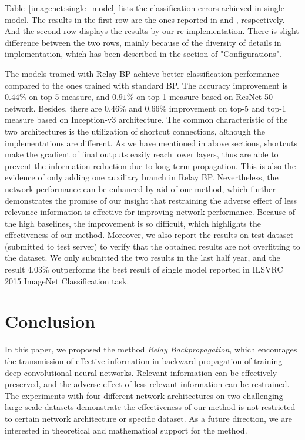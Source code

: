 \documentclass[runningheads]{llncs}
\begin{document}
Table~\ref{imagenet:single_model} lists the classification errors achieved in single model. The results in the first row are the ones reported in \cite{he_cvpr2016} and \cite{szegedy_2015}, respectively. And the second row displays the results by our re-implementation. There is slight difference between the two rows, mainly because of the diversity of details in implementation, which has been described in the section of "Configurations".

The models trained with Relay BP achieve better classification performance compared to the ones trained with standard BP. The accuracy improvement is $0.44\%$ on top-5 measure, and $0.91\%$ on top-1 measure based on ResNet-50 network. Besides, there are $0.46\%$ and $0.66\%$ improvement on top-5 and top-1 measure based on Inception-v3 architecture. The common characteristic of the two architectures is the utilization of shortcut connections, although the implementations are different. As we have mentioned in above sections, shortcuts make the gradient of final outputs easily reach lower layers, thus are able to prevent the information reduction due to long-term propagation. This is also the evidence of only adding one auxiliary branch in Relay BP. Nevertheless, the network performance can be enhanced by aid of our method, which further demonstrates the promise of our insight that restraining the adverse effect of less relevance information is effective for improving network performance. Because of the high baselines, the improvement is so difficult, which highlights the effectiveness of our method. Moreover, we also report the results on test dataset (submitted to test server) to verify that the obtained results are not overfitting to the dataset. We only submitted the two results in the last half year, and the result $4.03\%$ outperforms the best result of single model reported in ILSVRC 2015 ImageNet Classification task.


\section{Conclusion}
In this paper, we proposed the method {\it Relay Backpropagation}, which encourages the transmission of effective information in backward propagation of training deep convolutional neural networks. Relevant information can be effectively preserved, and the adverse effect of less relevant information can be restrained. The experiments with four different network architectures on two challenging large scale datasets demonstrate the effectiveness of our method is not restricted to certain network architecture or specific dataset. As a future direction, we are interested in theoretical and mathematical support for the method.



\end{document}
